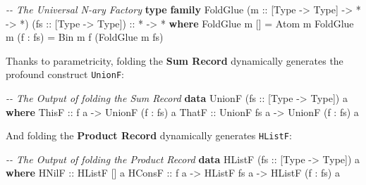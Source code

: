 \documentclass[
]{article}
\newenvironment{Shaded}{}{}
\newcommand{\CommentTok}[1]{\textcolor[rgb]{0.38,0.63,0.69}{\textit{#1}}}
\newcommand{\DataTypeTok}[1]{\textcolor[rgb]{0.56,0.13,0.00}{#1}}
\newcommand{\KeywordTok}[1]{\textcolor[rgb]{0.00,0.44,0.13}{\textbf{#1}}}
\newcommand{\NormalTok}[1]{#1}
\newcommand{\OperatorTok}[1]{\textcolor[rgb]{0.40,0.40,0.40}{#1}}
\newcommand{\OtherTok}[1]{\textcolor[rgb]{0.00,0.44,0.13}{#1}}
\begin{document}
\begin{Shaded}
\begin{Highlighting}[]
\CommentTok{{-}{-} The Universal N{-}ary Factory}
\KeywordTok{type} \KeywordTok{family} \DataTypeTok{FoldGlue}\NormalTok{ (}\OtherTok{m ::}\NormalTok{ [}\DataTypeTok{Type} \OtherTok{{-}\textgreater{}} \DataTypeTok{Type}\NormalTok{] }\OtherTok{{-}\textgreater{}} \OperatorTok{*} \OtherTok{{-}\textgreater{}} \OperatorTok{*}\NormalTok{) (}\OtherTok{fs ::}\NormalTok{ [}\DataTypeTok{Type} \OtherTok{{-}\textgreater{}} \DataTypeTok{Type}\NormalTok{])}\OtherTok{ ::} \OperatorTok{*} \OtherTok{{-}\textgreater{}} \OperatorTok{*} \KeywordTok{where}
    \DataTypeTok{FoldGlue}\NormalTok{ m \textquotesingle{}[]       }\OtherTok{=} \DataTypeTok{Atom}\NormalTok{ m}
    \DataTypeTok{FoldGlue}\NormalTok{ m (f \textquotesingle{}}\OperatorTok{:}\NormalTok{ fs) }\OtherTok{=} \DataTypeTok{Bin}\NormalTok{ m f (}\DataTypeTok{FoldGlue}\NormalTok{ m fs)}
\end{Highlighting}
\end{Shaded}

Thanks to parametricity, folding the \textbf{Sum Record} dynamically
generates the profound construct \texttt{UnionF}:

\begin{Shaded}
\begin{Highlighting}[]
\CommentTok{{-}{-} The Output of folding the Sum Record}
\KeywordTok{data} \DataTypeTok{UnionF}\NormalTok{ (}\OtherTok{fs ::}\NormalTok{ [}\DataTypeTok{Type} \OtherTok{{-}\textgreater{}} \DataTypeTok{Type}\NormalTok{]) a }\KeywordTok{where}
    \DataTypeTok{ThisF}\OtherTok{ ::}\NormalTok{ f a }\OtherTok{{-}\textgreater{}} \DataTypeTok{UnionF}\NormalTok{ (f \textquotesingle{}}\OperatorTok{:}\NormalTok{ fs) a}
    \DataTypeTok{ThatF}\OtherTok{ ::} \DataTypeTok{UnionF}\NormalTok{ fs a }\OtherTok{{-}\textgreater{}} \DataTypeTok{UnionF}\NormalTok{ (f \textquotesingle{}}\OperatorTok{:}\NormalTok{ fs) a}
\end{Highlighting}
\end{Shaded}

And folding the \textbf{Product Record} dynamically generates
\texttt{HListF}:

\begin{Shaded}
\begin{Highlighting}[]
\CommentTok{{-}{-} The Output of folding the Product Record}
\KeywordTok{data} \DataTypeTok{HListF}\NormalTok{ (}\OtherTok{fs ::}\NormalTok{ [}\DataTypeTok{Type} \OtherTok{{-}\textgreater{}} \DataTypeTok{Type}\NormalTok{]) a }\KeywordTok{where}
    \DataTypeTok{HNilF}\OtherTok{  ::} \DataTypeTok{HListF}\NormalTok{ \textquotesingle{}[] a                     }
    \DataTypeTok{HConsF}\OtherTok{ ::}\NormalTok{ f a }\OtherTok{{-}\textgreater{}} \DataTypeTok{HListF}\NormalTok{ fs a }\OtherTok{{-}\textgreater{}} \DataTypeTok{HListF}\NormalTok{ (f \textquotesingle{}}\OperatorTok{:}\NormalTok{ fs) a  }
\end{Highlighting}
\end{Shaded}
\end{document}
